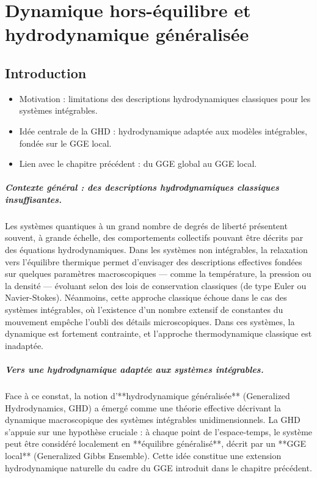 \chapter{Dynamique hors-équilibre et hydrodynamique généralisée}
\minitoc


\section*{Introduction}

{\color{blue}
\begin{itemize}
    \item Motivation : limitations des descriptions hydrodynamiques classiques pour les systèmes intégrables.
    \item Idée centrale de la GHD : hydrodynamique adaptée aux modèles intégrables, fondée sur le GGE local.
    \item Lien avec le chapitre précédent : du GGE global au GGE local.
\end{itemize}
}

\paragraph{Contexte général : des descriptions hydrodynamiques classiques insuffisantes.}
Les systèmes quantiques à un grand nombre de degrés de liberté présentent souvent, à grande échelle, des comportements collectifs pouvant être décrits par des équations hydrodynamiques. Dans les systèmes non intégrables, la relaxation vers l’équilibre thermique permet d’envisager des descriptions effectives fondées sur quelques paramètres macroscopiques — comme la température, la pression ou la densité — évoluant selon des lois de conservation classiques (de type Euler ou Navier-Stokes). Néanmoins, cette approche classique échoue dans le cas des systèmes intégrables, où l’existence d’un nombre extensif de constantes du mouvement empêche l’oubli des détails microscopiques. Dans ces systèmes, la dynamique est fortement contrainte, et l’approche thermodynamique classique est inadaptée.

\paragraph{Vers une hydrodynamique adaptée aux systèmes intégrables.}
Face à ce constat, la notion d’**hydrodynamique généralisée** (Generalized Hydrodynamics, GHD) a émergé comme une théorie effective décrivant la dynamique macroscopique des systèmes intégrables unidimensionnels. La GHD s’appuie sur une hypothèse cruciale : à chaque point de l’espace-temps, le système peut être considéré localement en **équilibre généralisé**, décrit par un **GGE local** (Generalized Gibbs Ensemble). Cette idée constitue une extension hydrodynamique naturelle du cadre du GGE introduit dans le chapitre précédent.

